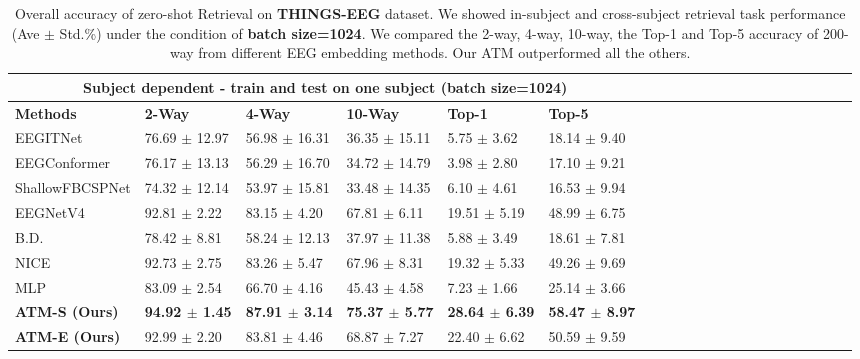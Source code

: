 \documentclass{article}
\begin{document}
\begin{table}[hp]
\caption{Overall accuracy of zero-shot Retrieval on \textbf{THINGS-EEG} dataset. We showed in-subject and cross-subject retrieval task performance (Ave $\pm$ Std.\%) under the condition of  \textbf{batch size=1024}. We compared the 2-way, 4-way, 10-way, the Top-1 and Top-5 accuracy of 200-way from different EEG embedding methods. Our ATM outperformed all the others.}
\label{oveall_retrieval1024}
\centering
\tiny %
\setlength\tabcolsep{3pt} %
\begin{tabular}{l*{20}{p{1.50cm}}} %
\toprule
    \multicolumn{6}{c}{Subject dependent - train and test on one subject (batch size=1024)} \\ \midrule
    \textbf{Methods}  & \textbf{2-Way} & \textbf{4-Way} & \textbf{10-Way} &  \textbf{Top-1} & \textbf{Top-5}\\ \midrule
    
    EEGITNet & 76.69 $\pm$ 12.97 & 56.98 $\pm$ 16.31 & 36.35 $\pm$ 15.11 & 5.75 $\pm$ 3.62 & 18.14 $\pm$ 9.40 \\
    EEGConformer & 76.17 $\pm$ 13.13 & 56.29 $\pm$ 16.70 & 34.72 $\pm$ 14.79 & 3.98 $\pm$ 2.80 & 17.10 $\pm$ 9.21 \\
    ShallowFBCSPNet & 74.32 $\pm$ 12.14 & 53.97 $\pm$ 15.81 & 33.48 $\pm$ 14.35 & 6.10 $\pm$ 4.61 & 16.53 $\pm$ 9.94 \\ 
    EEGNetV4 & 92.81 $\pm$ 2.22 & 83.15 $\pm$ 4.20 & 67.81 $\pm$ 6.11 & 19.51 $\pm$ 5.19 & 48.99 $\pm$ 6.75 \\
    B.D. & 78.42 $\pm$ 8.81 & 58.24 $\pm$ 12.13 & 37.97 $\pm$ 11.38 & 5.88 $\pm$ 3.49 & 18.61 $\pm$ 7.81 \\
    NICE & 92.73 $\pm$ 2.75 & 83.26 $\pm$ 5.47 & 67.96 $\pm$ 8.31 & 19.32 $\pm$ 5.33 & 49.26 $\pm$ 9.69 \\
    MLP & 83.09 $\pm$ 2.54 & 66.70 $\pm$ 4.16 & 45.43 $\pm$ 4.58 & 7.23 $\pm$ 1.66 & 25.14 $\pm$ 3.66 \\
    \textbf{ATM-S  (Ours)} & \textbf{94.92 $\pm$ 1.45} & \textbf{87.91 $\pm$ 3.14} & \textbf{75.37 $\pm$ 5.77} & \textbf{28.64 $\pm$ 6.39} & \textbf{58.47 $\pm$ 8.97} \\ 
    \textbf{ATM-E  (Ours)} & 92.99 $\pm$ 2.20 & 83.81 $\pm$ 4.46 & 68.87 $\pm$ 7.27 & 22.40 $\pm$ 6.62 & 50.59 $\pm$ 9.59 \\ \midrule


\end{tabular}
\end{table}
\end{document}
